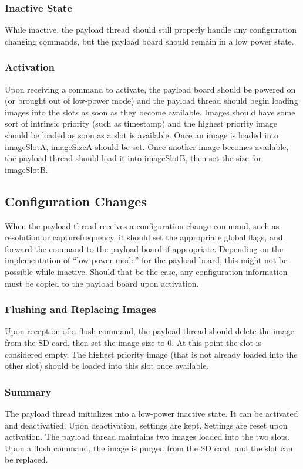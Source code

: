 \documentclass{article}
\begin{document}
\subsubsection{Inactive State}
 While inactive, the payload thread should
still properly handle any configuration changing commands, but the payload board
should remain in a low power state.

\subsubsection{Activation}
Upon receiving a command to activate, the payload board should be powered on (or
brought out of low-power mode) and the payload thread should begin loading 
images into the slots as soon as they become available. Images should have some
sort of intrinsic priority (such as timestamp) and the highest priority image
should be loaded as soon as a slot is available. Once an image is loaded into
imageSlotA, imageSizeA should be set. Once another image becomes available, 
the payload thread should load it into imageSlotB, then set the size for
imageSlotB.

\subsection{Configuration Changes}
When the payload thread receives a configuration change command, such as resolution
or capturefrequency, it should set the appropriate global flags, and forward
the command to the payload board if appropriate. Depending on the implementation
of ``low-power mode'' for the payload board, this might not be possible while
inactive. Should that be the case, any configuration information must be copied to
the payload board upon activation.

\subsubsection{Flushing and Replacing Images}
Upon reception of a flush command, the payload thread should delete the image
from the SD card, then set the image size to 0. At this point the slot is
considered empty. The highest priority image (that is not already loaded into
the other slot) should be loaded into this slot
once available.

\subsubsection{Summary}
The payload thread initializes into a low-power inactive state. It can be
activated and deactivatied. Upon deactivation, settings are kept. Settings 
are reset upon activation. The payload thread maintains two images loaded
into the two slots. Upon a flush command, the image is purged from 
the SD card, and the slot can be replaced.
\end{document}
